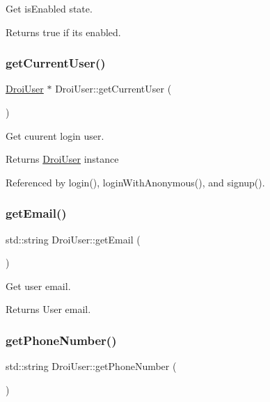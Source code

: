 Get is\+Enabled state. \begin{DoxyReturn}{Returns}
true if it\textquotesingle{}s enabled. 
\end{DoxyReturn}
\mbox{\label{class_droi_user_a43acc04ec54f82a3bf2c0ea013245f82}} 
\subsubsection{\texorpdfstring{get\+Current\+User()}{getCurrentUser()}}
{\footnotesize\ttfamily \hyperlink{class_droi_user}{Droi\+User} $\ast$ Droi\+User\+::get\+Current\+User (\begin{DoxyParamCaption}{ }\end{DoxyParamCaption})\hspace{0.3cm}{\ttfamily [static]}}

Get cuurent login user. \begin{DoxyReturn}{Returns}
\hyperlink{class_droi_user}{Droi\+User} instance 
\end{DoxyReturn}


Referenced by login(), login\+With\+Anonymous(), and signup().

\mbox{\label{class_droi_user_a13d2714ae33f6064da1448736e78ea02}} 
\subsubsection{\texorpdfstring{get\+Email()}{getEmail()}}
{\footnotesize\ttfamily std\+::string Droi\+User\+::get\+Email (\begin{DoxyParamCaption}{ }\end{DoxyParamCaption})}

Get user email. \begin{DoxyReturn}{Returns}
User email. 
\end{DoxyReturn}
\mbox{\label{class_droi_user_a346b687624c9b1df80de63e39799e5d1}} 
\subsubsection{\texorpdfstring{get\+Phone\+Number()}{getPhoneNumber()}}
{\footnotesize\ttfamily std\+::string Droi\+User\+::get\+Phone\+Number (\begin{DoxyParamCaption}{ }\end{DoxyParamCaption})}

